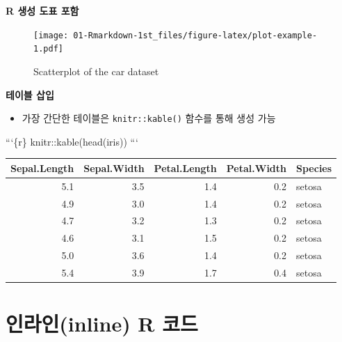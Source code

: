 \documentclass[
  11pt,
]{krantz}
\newenvironment{Shaded}{\begin{snugshade}}{\end{snugshade}}
\newcommand{\BaseNTok}[1]{\textcolor[rgb]{0.06,0.06,0.06}{#1}}
\providecommand{\tightlist}{%
  \setlength{\itemsep}{0pt}\setlength{\parskip}{0pt}}
\begin{document}
\normalsize

\begin{Shaded}
\end{Shaded}

\textbf{R 생성 도표 포함}

\footnotesize

\begin{figure}
\centering
\texttt{[image: 01-Rmarkdown-1st\_files/figure-latex/plot-example-1.pdf]}
\caption{\label{fig:plot-example}Scatterplot of the car dataset}
\end{figure}

\normalsize

\textbf{테이블 삽입}

\begin{itemize}
\tightlist
\item
  가장 간단한 테이블은 \texttt{knitr::kable()} 함수를 통해 생성 가능
\end{itemize}

\begin{Shaded}
\begin{Highlighting}[]
\BaseNTok{```\{r\}}
\BaseNTok{knitr::kable(head(iris))}
\BaseNTok{```}
\end{Highlighting}
\end{Shaded}

\footnotesize

\begin{tabular}{r|r|r|r|l}
\hline
Sepal.Length & Sepal.Width & Petal.Length & Petal.Width & Species\\
\hline
5.1 & 3.5 & 1.4 & 0.2 & setosa\\
\hline
4.9 & 3.0 & 1.4 & 0.2 & setosa\\
\hline
4.7 & 3.2 & 1.3 & 0.2 & setosa\\
\hline
4.6 & 3.1 & 1.5 & 0.2 & setosa\\
\hline
5.0 & 3.6 & 1.4 & 0.2 & setosa\\
\hline
5.4 & 3.9 & 1.7 & 0.4 & setosa\\
\hline
\end{tabular}

\normalsize

\hypertarget{inline-code}{%
\section{인라인(inline) R 코드}\label{inline-code}}
\end{document}
